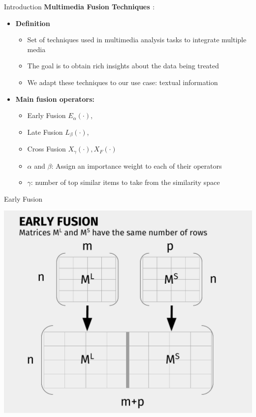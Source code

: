 \documentclass[10pt,xcolor=table]{beamer}
\begin{document}
\begin{frame}{Introduction}
\large \textbf{Multimedia Fusion Techniques \cite{AtreyHEK10,ahn2010link}}:
\begin{itemize}
\item \large \textbf{Definition}
	\begin{itemize}
	\item Set of techniques used in multimedia analysis tasks to integrate multiple media 
	\item The goal is to obtain rich insights about the data being treated
	\item We adapt these techniques to our use case: textual information
	\end{itemize}
\item \textbf{Main fusion operators:}
	\begin{itemize}
	\item Early Fusion $E_\alpha(\cdot)$, 
	\item Late Fusion $L_\beta(\cdot)$, 
	\item Cross Fusion $X_\gamma(\cdot), X_F(\cdot)$
	\item $\alpha$ and $\beta$: Assign an importance weight to each of their operators 
	\item $\gamma$: number of top similar items to take from the similarity space
	\end{itemize}

\end{itemize}
\end{frame}




\begin{frame}{Early Fusion}
\begin{center}
\includegraphics[width=.7\linewidth]{image2/Chapitre3/ef_diag}
\end{center}
\end{frame}
\end{document}
